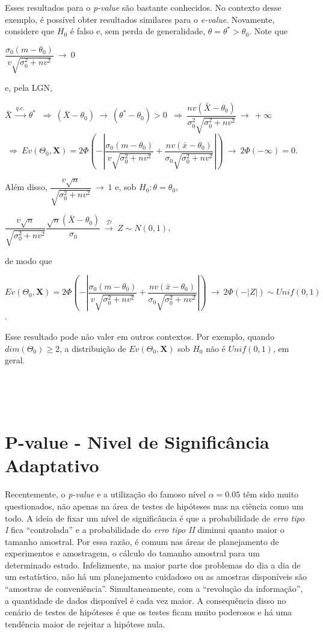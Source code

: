 \documentclass[
]{book}
\begin{document}
Esses resultados para o \emph{p-value} são bastante conhecidos. No contexto desse exemplo, é possível obter resultados similares para o \emph{e-value}. Novamente, considere que \(H_0\) é falso e, sem perda de generalidade, \(\theta=\theta^*>\theta_0\). Note que

\(\dfrac{{\sigma}_0(m-\theta_0)}{v\sqrt{{\sigma}_0^2+nv^2}} ~\longrightarrow~ 0\)

e, pela LGN,

\(\bar{X} ~\overset{q.c.}{\longrightarrow}~ \theta^*\)
\(~\Longrightarrow~ (\bar{X}-\theta_0) ~{\longrightarrow}~ (\theta^*-\theta_0) >0\)
\(~\Longrightarrow~ \dfrac{nv(\bar{X}-\theta_0)}{{\sigma}_0^2\sqrt{{\sigma}_0^2+nv^2}} ~{\longrightarrow}~ +\infty\)
\(~\Longrightarrow~ Ev(\Theta_0,\boldsymbol X)=2\Phi\left(-\left|\dfrac{{\sigma}_0(m-\theta_0)}{v{\sqrt{{\sigma}_0^2+nv^2}}}+\dfrac{nv(\bar x-\theta_0)}{{\sigma}_0{\sqrt{{\sigma}_0^2+nv^2}}}\right|\right) ~{\longrightarrow}~ 2\Phi\left(-\infty\right)=0\).

Além disso, \(\dfrac{v\sqrt{n}}{\sqrt{{\sigma}_0^2+nv^2}} ~\longrightarrow~ 1\) e, sob \(H_0: \theta = \theta_0\),

\(\dfrac{v\sqrt{n}}{\sqrt{{\sigma}_0^2+nv^2}}\dfrac{\sqrt{n}(\bar{X}-\theta_0)}{{\sigma}_0} ~\overset{\mathcal{D}}\longrightarrow~ Z \sim N(0,1)\),

de modo que

\(Ev(\Theta_0,\boldsymbol{X})=2\Phi\left(-\left|\dfrac{{\sigma}_0(m-\theta_0)}{v{\sqrt{{\sigma}_0^2+nv^2}}}+\dfrac{nv(\bar x-\theta_0)}{{\sigma}_0{\sqrt{{\sigma}_0^2+nv^2}}}\right|\right) ~{\longrightarrow}~ 2\Phi\left(-|Z|\right)\sim Unif(0,1)\).

Esse resultado pode não valer em outros contextos. Por exemplo, quando \(dim(\Theta_0)\geq 2\), a distribuição de \(Ev(\Theta_0,\boldsymbol{X})\) sob \(H_0\) não é \(Unif(0,1)\), em geral.

\(~\)

\(~\)

\hypertarget{p-value---nivel-de-significuxe2ncia-adaptativo}{%
\section{P-value - Nivel de Significância Adaptativo}\label{p-value---nivel-de-significuxe2ncia-adaptativo}}

Recentemente, o \emph{p-value} e a utilização do famoso nível \(\alpha=0.05\) têm sido muito questionados, não apenas na área de testes de hipóteses mas na ciência como um todo. A ideia de fixar um nível de significância é que a probabilidade de \emph{erro tipo I} fica ``controlada'' e a probabilidade do \emph{erro tipo II} diminui quanto maior o tamanho amostral. Por essa razão, é comum nas áreas de planejamento de experimentos e amostragem, o cálculo do tamanho amostral para um determinado estudo. Infelizmente, na maior parte dos problemas do dia a dia de um estatístico, não há um planejamento cuidadoso ou as amostras disponíveis são ``amostras de conveniência''. Simultaneamente, com a ``revolução da informação'', a quantidade de dados disponível é cada vez maior. A consequência disso no cenário de testes de hipóteses é que os testes ficam muito poderosos e há uma tendência maior de rejeitar a hipótese nula.
\end{document}
